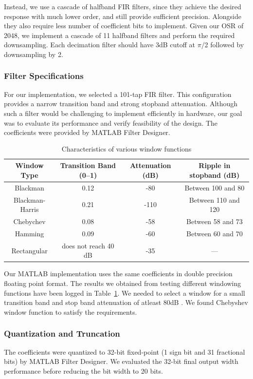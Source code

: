 \documentclass[11pt,onecolumn]{IEEEtran}
\begin{document}
Instead, we use a cascade of halfband FIR filters, since they achieve the desired response with much lower order, and still provide sufficient precision. Alongside they also require less number of coefficient bits to implement. Given our OSR of 2048, we implement a cascade of 11 halfband filters and perform the required downsampling. Each decimation filter should have 3dB cutoff at $\pi$/2 followed by downsampling by 2.
\vspace{1mm}
\subsubsection{Filter Specifications}
For our implementation, we selected a 101-tap FIR filter. This configuration provides a narrow transition band and strong stopband attenuation. Although such a filter would be challenging to implement efficiently in hardware, our goal was to evaluate its performance and verify feasibility of the design. The coefficients were provided by MATLAB Filter Designer.
\vspace{1mm}
\begin{table}[h!]
\centering
\begin{tabular}{|c|c|c|c|}
\hline
\textbf{Window Type} & \textbf{Transition Band (0–1)} & \textbf{Attenuation (dB)} & \textbf{Ripple in stopband (dB)} \\ \hline
Blackman & 0.12 & -80 & Between 100 and 80 \\ \hline
Blackman-Harris & 0.21 & -110 & Between 110 and 120 \\ \hline
Chebychev & 0.08 & -58 & Between 58 and 73 \\ \hline
Hamming & 0.09 & -60 & Between 60 and 70 \\ \hline
Rectangular & does not reach 40 dB & -35 & --- \\ \hline
\end{tabular}
\caption{Characteristics of various window functions}
\label{tab:window_comparison}
\end{table}

   Our MATLAB implementation uses the same coefficients in double precision floating point format. The results we obtained from testing different windowing functions have been logged in Table~\ref{tab:window_comparison}. We needed to select a window for a small transition band and stop band attenuation of atleast 80dB \cite{windowing}. We found Chebyshev window function to satisfy the requirements.
\vspace{1mm}
\subsubsection{Quantization and Truncation}
The coefficients were quantized to 32-bit fixed-point (1 sign bit and 31 fractional bits) by MATLAB Filter Designer. We evaluated the 32-bit final output width performance before reducing the bit width to 20 bits.
\end{document}
